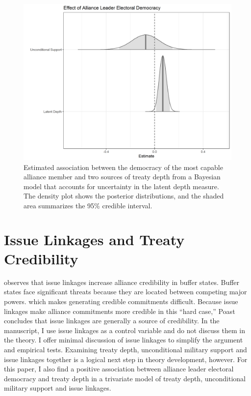 \documentclass[12pt]{article}
\begin{document}
\begin{figure}
\includegraphics[width=.95\textwidth]{results-unc-depth.png}  
\caption{Estimated association between the democracy of the most capable alliance member and two sources of treaty depth from a Bayesian model that accounts for uncertainty in the latent depth measure. The density plot shows the posterior distributions, and the shaded area summarizes the 95\% credible interval.}
\label{fig:results-unc-depth}
\end{figure}




\section{Issue Linkages and Treaty Credibility}


\citep{Poast2013} observes that issue linkages increase alliance credibility in buffer states.
Buffer states face significant threats because they are located between competing major powers. which makes generating credible commitments difficult.
Because issue linkages make alliance commitments more credible in this ``hard case,'' Poast concludes that issue linkages are generally a source of credibility.
In the manuscript, I use issue linkages as a control variable and do not discuss them in the theory. 
I offer minimal discussion of issue linkages to simplify the argument and empirical tests. 
Examining treaty depth, unconditional military support and issue linkages together is a logical next step in theory development, however. 
For this paper, I also find a positive association between alliance leader electoral democracy and treaty depth in a trivariate model of treaty depth, unconditional military support and issue linkages. 
\end{document}
